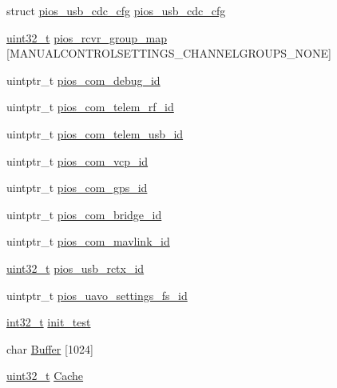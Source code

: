 \begin{DoxyCompactItemize}
\item 
struct \hyperlink{structpios__usb__cdc__cfg}{pios\-\_\-usb\-\_\-cdc\-\_\-cfg} \hyperlink{group___open_pilot_core_ga05cc3e449d417c7f9097d2659e6f5ca3}{pios\-\_\-usb\-\_\-cdc\-\_\-cfg}
\item 
\hyperlink{stdint_8h_a435d1572bf3f880d55459d9805097f62}{uint32\-\_\-t} \hyperlink{group___open_pilot_core_ga6c6cfc16eb738e47c123298e062297e2}{pios\-\_\-rcvr\-\_\-group\-\_\-map} \mbox{[}M\-A\-N\-U\-A\-L\-C\-O\-N\-T\-R\-O\-L\-S\-E\-T\-T\-I\-N\-G\-S\-\_\-\-C\-H\-A\-N\-N\-E\-L\-G\-R\-O\-U\-P\-S\-\_\-\-N\-O\-N\-E\mbox{]}
\item 
uintptr\-\_\-t \hyperlink{group___open_pilot_core_ga14dc9e3d330b80a37a9699c2112358e0}{pios\-\_\-com\-\_\-debug\-\_\-id}
\item 
uintptr\-\_\-t \hyperlink{group___open_pilot_core_gae48e848f715b08971e23528feee79339}{pios\-\_\-com\-\_\-telem\-\_\-rf\-\_\-id}
\item 
uintptr\-\_\-t \hyperlink{group___open_pilot_core_ga513cc36d72b76de2fcb75ff233a79a4a}{pios\-\_\-com\-\_\-telem\-\_\-usb\-\_\-id}
\item 
uintptr\-\_\-t \hyperlink{group___open_pilot_core_gaaeb3e0d65ed5c6e7b921c54e1ad905db}{pios\-\_\-com\-\_\-vcp\-\_\-id}
\item 
uintptr\-\_\-t \hyperlink{group___open_pilot_core_ga05dca72c42c6c2b33fa62b8ee0fcb2ea}{pios\-\_\-com\-\_\-gps\-\_\-id}
\item 
uintptr\-\_\-t \hyperlink{group___open_pilot_core_gac040f05fa048688ee0269c2768698a14}{pios\-\_\-com\-\_\-bridge\-\_\-id}
\item 
uintptr\-\_\-t \hyperlink{group___open_pilot_core_gabdefeb92517c08b2db19b764db941de9}{pios\-\_\-com\-\_\-mavlink\-\_\-id}
\item 
\hyperlink{stdint_8h_a435d1572bf3f880d55459d9805097f62}{uint32\-\_\-t} \hyperlink{group___open_pilot_core_ga310e72613cea7a03a60834289dbe42a5}{pios\-\_\-usb\-\_\-rctx\-\_\-id}
\item 
uintptr\-\_\-t \hyperlink{group___open_pilot_core_gab060f441dd600b08386c0ca1b487217a}{pios\-\_\-uavo\-\_\-settings\-\_\-fs\-\_\-id}
\item 
\hyperlink{group___n_a_m_e_gafd12020da5a235dfcf0c3c748fb5baed}{int32\-\_\-t} \hyperlink{group___open_pilot_core_ga3ae7a284153c846031abf3ab8b2784c0}{init\-\_\-test}
\item 
char \hyperlink{group___open_pilot_core_gaaf1490d688e7cf0c41987d87572ff80a}{Buffer} \mbox{[}1024\mbox{]}
\item 
\hyperlink{stdint_8h_a435d1572bf3f880d55459d9805097f62}{uint32\-\_\-t} \hyperlink{group___open_pilot_core_gaef8c3e152589675df7f5b49cc1ba7ffd}{Cache}

\end{DoxyCompactItemize}
